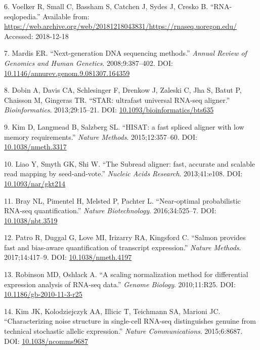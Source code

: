 \documentclass[11pt,a4paper,titlepage,twoside,openright]{style/unimelbthesis}
\theoremstyle{definition}
\theoremstyle{definition}
\theoremstyle{definition}
\theoremstyle{remark}
\begin{document}
\begin{mainmatter}
\leavevmode\hypertarget{ref-Voelker_undated-ze}{}%
6. Voelker R, Small C, Bassham S, Catchen J, Sydes J, Cresko B. ``RNA-seqlopedia.'' Available from: \url{https://web.archive.org/web/20181218043831/https://rnaseq.uoregon.edu/} Accessed: 2018-12-18

\leavevmode\hypertarget{ref-Mardis2008-ju}{}%
7. Mardis ER. ``Next-generation DNA sequencing methods.'' \emph{Annual Review of Genomics and Human Genetics}. 2008;9:387--402. DOI: \href{https://doi.org/10.1146/annurev.genom.9.081307.164359}{10.1146/annurev.genom.9.081307.164359}

\leavevmode\hypertarget{ref-Dobin2013-gx}{}%
8. Dobin A, Davis CA, Schlesinger F, Drenkow J, Zaleski C, Jha S, Batut P, Chaisson M, Gingeras TR. ``STAR: ultrafast universal RNA-seq aligner.'' \emph{Bioinformatics}. 2013;29:15--21. DOI: \href{https://doi.org/10.1093/bioinformatics/bts635}{10.1093/bioinformatics/bts635}

\leavevmode\hypertarget{ref-Kim2015-ys}{}%
9. Kim D, Langmead B, Salzberg SL. ``HISAT: a fast spliced aligner with low memory requirements.'' \emph{Nature Methods}. 2015;12:357--60. DOI: \href{https://doi.org/10.1038/nmeth.3317}{10.1038/nmeth.3317}

\leavevmode\hypertarget{ref-Liao2013-id}{}%
10. Liao Y, Smyth GK, Shi W. ``The Subread aligner: fast, accurate and scalable read mapping by seed-and-vote.'' \emph{Nucleic Acids Research}. 2013;41:e108. DOI: \href{https://doi.org/10.1093/nar/gkt214}{10.1093/nar/gkt214}

\leavevmode\hypertarget{ref-Bray2016-tm}{}%
11. Bray NL, Pimentel H, Melsted P, Pachter L. ``Near-optimal probabilistic RNA-seq quantification.'' \emph{Nature Biotechnology}. 2016;34:525--7. DOI: \href{https://doi.org/10.1038/nbt.3519}{10.1038/nbt.3519}

\leavevmode\hypertarget{ref-Patro2017-ka}{}%
12. Patro R, Duggal G, Love MI, Irizarry RA, Kingsford C. ``Salmon provides fast and bias-aware quantification of transcript expression.'' \emph{Nature Methods}. 2017;14:417--9. DOI: \href{https://doi.org/10.1038/nmeth.4197}{10.1038/nmeth.4197}

\leavevmode\hypertarget{ref-Robinson2010-ll}{}%
13. Robinson MD, Oshlack A. ``A scaling normalization method for differential expression analysis of RNA-seq data.'' \emph{Genome Biology}. 2010;11:R25. DOI: \href{https://doi.org/10.1186/gb-2010-11-3-r25}{10.1186/gb-2010-11-3-r25}

\leavevmode\hypertarget{ref-Kim2015-mo}{}%
14. Kim JK, Kolodziejczyk AA, Illicic T, Teichmann SA, Marioni JC. ``Characterizing noise structure in single-cell RNA-seq distinguishes genuine from technical stochastic allelic expression.'' \emph{Nature Communications}. 2015;6:8687. DOI: \href{https://doi.org/10.1038/ncomms9687}{10.1038/ncomms9687}


\end{mainmatter}
\end{document}
